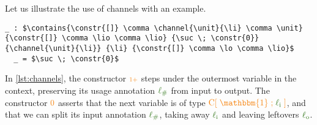 \documentclass[a4paper,UKenglish,cleveref,autoref,thm-restate,authorcolumns]{lipics-v2019}
\theoremstyle{definition}
\newcommand{\type}[1]{\textcolor{BlueViolet}{\operatorname{#1}}}
\newcommand{\constr}[1]{\textcolor{BurntOrange}{\operatorname{#1}}}
\newcommand{\func}[1]{\textcolor{OliveGreen}{\operatorname{#1}}}
\newcommand{\suc}{\constr{\scriptstyle 1+}}
\newcommand{\unit}{\constr{\mathbbm{1}}}
\newcommand{\channel}[2]{\constr{C[} \; #1 \; \constr{;} \; #2 \; \constr{]}}
\newcommand{\comma}{\; \constr{,} \;}
\newcommand{\li}{\func{\ell_i}}
\newcommand{\lo}{\func{\ell_o}}
\newcommand{\lio}{\func{\ell_{\#}}}
\newcommand{\contains}[6]{#1 \; \type{;} \; #2 \; \type{\ni}_{#3} \; #4 \; \type{;} \; #5 \; \type{\triangleright} \; #6}
\begin{document}
\begin{example}[Channels]
  Let us illustrate the use of channels with an example.
  \begin{lstlisting}[label=lst:channels,mathescape,caption=The underscore \_ introduces an anonymous declaration immediately followed by its definition.]
  _ : $\contains{\constr{[]} \comma \channel{\unit}{\li} \comma \unit} {\constr{[]} \comma \lio \comma \lio} {\suc \; \constr{0}} {\channel{\unit}{\li}} {\li} {\constr{[]} \comma \lo \comma \lio}$
  _ = $\suc \; \constr{0}$
  \end{lstlisting}
  In \autoref{lst:channels}, the constructor $\suc$ steps under the outermost variable in the context, preserving its usage annotation $\lio$ from input to output.
  The constructor $\constr{0}$ asserts that the next variable is of type $\channel{\unit}{\li}$, and that we can split its input annotation $\lio$, taking away $\li$ and leaving leftovers $\lo$.
\end{example}
\end{document}
